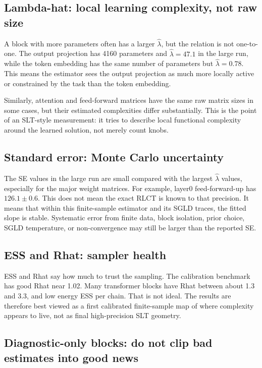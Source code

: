\documentclass[11pt]{article}
\begin{document}
\subsection{Lambda-hat: local learning complexity, not raw size}

A block with more parameters often has a larger \(\hat\lambda\), but the relation
is not one-to-one. The output projection has 4160 parameters and
\(\hat\lambda=47.1\) in the large run, while the token embedding has the same
number of parameters but \(\hat\lambda=0.78\). This means the estimator sees the
output projection as much more locally active or constrained by the task than
the token embedding.

Similarly, attention and feed-forward matrices have the same raw matrix sizes in
some cases, but their estimated complexities differ substantially. This is the
point of an SLT-style measurement: it tries to describe local functional
complexity around the learned solution, not merely count knobs.

\subsection{Standard error: Monte Carlo uncertainty}

The SE values in the large run are small compared with the largest \(\hat\lambda\)
values, especially for the major weight matrices. For example, layer0
feed-forward-up has \(126.1 \pm 0.6\). This does not mean the exact RLCT is known
to that precision. It means that within this finite-sample estimator and its
SGLD traces, the fitted slope is stable. Systematic error from finite data,
block isolation, prior choice, SGLD temperature, or non-convergence may still be
larger than the reported SE.

\subsection{ESS and Rhat: sampler health}

ESS and Rhat say how much to trust the sampling. The calibration benchmark has
good Rhat near 1.02. Many transformer blocks have Rhat between about 1.3 and
3.3, and low energy ESS per chain. That is not ideal. The results are therefore
best viewed as a first calibrated finite-sample map of where complexity appears
to live, not as final high-precision SLT geometry.

\subsection{Diagnostic-only blocks: do not clip bad estimates into good news}
\end{document}

